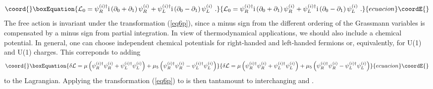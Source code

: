 \documentclass[a4paper,twocolumn,aps]{revtex4}
\begin{document}
\begin{equation}\coord{}\boxEquation{
{\cal L}_0 = \psi_R^{(i)\dagger} {\rm i}\left( \partial_0 + \partial_1\right) \psi_R^{(i)} +
 \psi_L^{(i)\dagger} {\rm i}\left( \partial_0 - \partial_1\right) \psi_L^{(i)} \ . 
\label{eq7p}
}{
{\cal L}_0 = \psi_R^{(i)\dagger} {\rm i}\left( \partial_0 + \partial_1\right) \psi_R^{(i)} +
 \psi_L^{(i)\dagger} {\rm i}\left( \partial_0 - \partial_1\right) \psi_L^{(i)} \ . 
}{ecuacion}\coordE{}\end{equation}
The free action is invariant under the transformation (\ref{eq6p}), since a minus sign
from the different ordering of the Grassmann variables is compensated by a minus
sign from partial integration. In view of thermodynamical applications, we should also
include a chemical potential. In general, one can choose independent chemical
potentials for right-handed and left-handed fermions or, equivalently, for U(1)\coordHE{} and
U(1)\coordHE{} charges. This correponds to adding
\begin{equation}\coord{}\boxEquation{
\delta {\cal L} = \mu \left( \psi_R^{(i)\dagger} \psi_R^{(i)} +\psi_L^{(i)\dagger} \psi_L^{(i)}\right)
+ \mu_5  \left( \psi_R^{(i)\dagger} \psi_R^{(i)} - \psi_L^{(i)\dagger} \psi_L^{(i)}\right)
\label{eq8p}
}{
\delta {\cal L} = \mu \left( \psi_R^{(i)\dagger} \psi_R^{(i)} +\psi_L^{(i)\dagger} \psi_L^{(i)}\right)
+ \mu_5  \left( \psi_R^{(i)\dagger} \psi_R^{(i)} - \psi_L^{(i)\dagger} \psi_L^{(i)}\right)
}{ecuacion}\coordE{}\end{equation}
to the Lagrangian. Applying the transformation (\ref{eq6p}) to \coordHE{}
is then tantamount to interchanging \myHighlight{$\mu$}\coordHE{} and \coordHE{}. 
\end{document}
